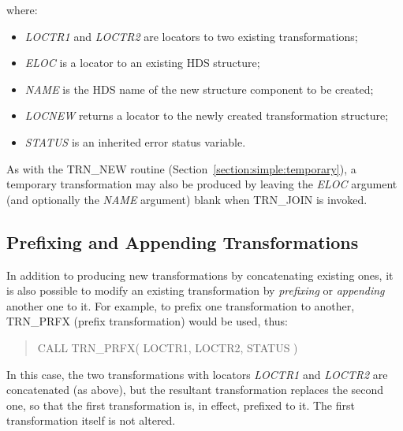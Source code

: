 \documentclass[twoside,nolof,11pt]{starlink}
\providecommand{\name}[1]{\small{#1}}
\providecommand{\fortvar}[1]{\emph{#1}}
\begin{document}
where:

\begin{itemize}

\item \fortvar{LOCTR1} and \fortvar{LOCTR2} are locators to two existing
transformations;

\item \fortvar{ELOC} is a locator to an existing \name{HDS} structure;

\item \fortvar{NAME} is the \name{HDS} name of the new structure component
to be created;

\item \fortvar{LOCNEW} returns a locator to the newly created transformation
structure;

\item \fortvar{STATUS} is an inherited error status variable.

\end{itemize}

As with the \name{TRN\_NEW} routine
(Section~\ref{section:simple:temporary}), a temporary transformation may
also be produced by leaving the \fortvar{ELOC} argument (and optionally the
\fortvar{NAME} argument) blank when \name{TRN\_JOIN} is invoked.


\subsection{Prefixing and Appending Transformations}

\label{section:additional:prefix}

In addition to producing new transformations by concatenating existing ones,
it is also possible to modify an existing transformation by \emph{prefixing}
or \emph{appending} another one to it.
For example, to prefix one transformation to another, \name{TRN\_PRFX}
(prefix transformation) would be used, thus:

\begin{quote}
\begin{terminalv}
CALL TRN_PRFX( LOCTR1, LOCTR2, STATUS )
\end{terminalv}
\end{quote}

In this case, the two transformations with locators \fortvar{LOCTR1} and
\fortvar{LOCTR2} are concatenated (as above), but the resultant
transformation replaces the second one, so that the first transformation is,
in effect, prefixed to it.
The first transformation itself is not altered.
\end{document}
